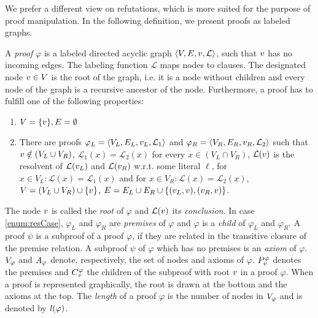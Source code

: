 We prefer a different view on refutations, which is more suited for the purpose of proof manipulation.
In the following definition, we present proofs as labeled graphs.

\begin{definition}[Proof] 
\label{def:proof}
A \emph{proof} $\varphi$ is a labeled directed acyclic graph $\langle V,E,v,\mathcal{L} \rangle$, such that $v$ has no incoming edges.
The labeling function $\mathcal{L}$ maps nodes to clauses.
The designated node $v \in V$ is the root of the graph, i.e. it is a node without children and every node of the graph is a recursive ancestor of the node.
Furthermore, a proof has to fulfill one of the following properties:

\begin{enumerate}
	\item $V = \{v\}, E = \emptyset$
	\item \label{enum:resCase} 
		There are proofs $\varphi_L = \langle V_L, E_L, v_L,\mathcal{L}_1 \rangle$ and $\varphi_R = \langle V_R, E_R, v_R, \mathcal{L}_2 \rangle$ such that 
		$v \notin (V_L \cup V_R)$, $\mathcal{L}_1(x) = \mathcal{L}_2(x)$ for every $x \in (V_L \cap V_R)$,
		$\mathcal{L}(v)$ is the resolvent of $\mathcal{L}(v_L)$ and $\mathcal{L}(v_R)$ w.r.t. some literal $\ell$,
		for $x \in V_L: \mathcal{L}(x) = \mathcal{L}_1(x)$ and for $x \in V_R: \mathcal{L}(x) = \mathcal{L}_2(x)$,
		$V = (V_L \cup V_R) \cup \{v \}$, $E = E_L \cup E_R \cup \{(v_L,v) , (v_R,v) \}$.
\end{enumerate}

The node $v$ is called the \emph{root} of $\varphi$ and $\mathcal{L}(v)$ its \emph{conclusion}.
In case \ref{enum:resCase}, $\varphi_L$ and $\varphi_R$ are \emph{premises} of $\varphi$ and $\varphi$ is a \emph{child} of $\varphi_L$ and $\varphi_R$.
A proof $\psi$ is a subproof of a proof $\varphi$, if they are related in the transitive closure of the premise relation.
A subproof $\psi$ of $\varphi$ which has no premises is an \emph{axiom} of $\varphi$.
$V_{\varphi}$ and $A_{\varphi}$ denote, respectively, the set of nodes and axioms of $\varphi$. 
$P_{v}^{\varphi}$ denotes the premises and $C_{v}^{\varphi}$ the children of the subproof with root $v$ in a proof $\varphi$. 
When a proof is represented graphically, the root is drawn at the bottom and the axioms at the top. 
The \emph{length} of a proof $\varphi$ is the number of nodes in $V_{\varphi}$ and is denoted by $\mathit{l}(\varphi)$.
\end{definition}


